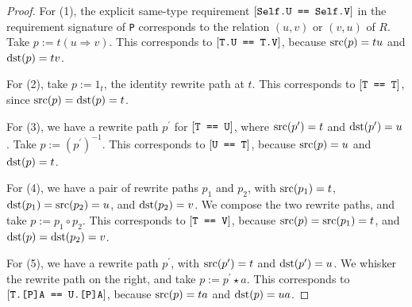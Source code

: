 \documentclass[../generics]{subfiles}
\begin{document}
\begin{proof}
For (1), the explicit same-type requirement $[\texttt{Self.U == Self.V}]$ in the requirement signature of \texttt{P} corresponds to the relation $(u, v)$ or $(v, u)$ of $R$. Take $p:=t(u\Rightarrow v)$. This corresponds to $[\texttt{T.U == T.V}]$, because $\operatorname{src}(p)=tu$ and $\operatorname{dst}(p)=tv$.

For (2), take $p:=1_t$, the identity rewrite path at $t$. This corresponds to $[\texttt{T == T}]$, since $\operatorname{src}(p)=\operatorname{dst}(p)=t$.

For (3), we have a rewrite path $p^\prime$ for $[\texttt{T == U}]$, where $\operatorname{src}(p^\prime)=t$ and $\operatorname{dst}(p^\prime)=u$. Take $p := (p^\prime)^{-1}$. This corresponds to $[\texttt{U == T}]$, because $\operatorname{src}(p)=u$ and $\operatorname{dst}(p)=t$.

For (4), we have a pair of rewrite paths $p_1$ and $p_2$, with $\operatorname{src}(p_1)=t$, $\operatorname{dst}(p_1)=\operatorname{src}(p_2)=u$, and $\operatorname{dst}(p_2)=v$. We compose the two rewrite paths, and take $p:=p_1\circ p_2$. This corresponds to $[\texttt{T == V}]$, because $\operatorname{src}(p)=\operatorname{src}(p_1)=t$, and $\operatorname{dst}(p)=\operatorname{dst}(p_2)=v$.

For (5), we have a rewrite path $p^\prime$, with $\operatorname{src}(p^\prime)=t$ and $\operatorname{dst}(p^\prime)=u$. We whisker the rewrite path on the right, and take $p:=p^\prime\star a$. This corresponds to $[\texttt{T.[P]A == U.[P]A}]$, because $\operatorname{src}(p)=ta$ and $\operatorname{dst}(p)=ua$.
\end{proof}
\end{document}
